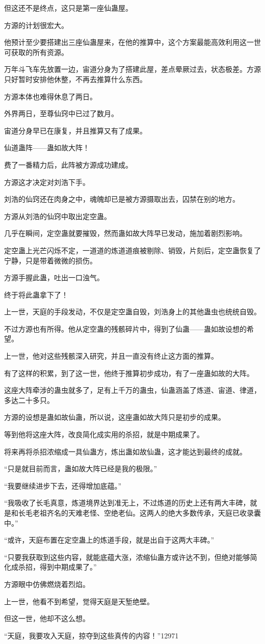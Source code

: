 \begin{this_body}
但这还不是终点，这只是第一座仙蛊屋。

方源的计划很宏大。

他预计至少要搭建出三座仙蛊屋来，在他的推算中，这个方案最能高效利用这一世可获取的所有资源。

万年斗飞车先放置一边，宙道分身为了搭建此屋，差点晕厥过去，状态极差。方源只好暂时安排他休整，不再去推算什么东西。

方源本体也难得休息了两日。

外界两日，至尊仙窍中已过了数月。

宙道分身早已在康复，并且推算又有了成果。

仙道蛊阵——蛊如故大阵！

费了一番精力后，此阵被方源成功建成。

方源这才决定对刘浩下手。

刘浩的仙窍还在肉身之中，魂魄却已是被方源摄取出去，囚禁在别的地方。

方源从刘浩的仙窍中取出定空蛊。

几乎在瞬间，定空蛊就要摧毁，然而蛊如故大阵早已发动，施加着剧烈影响。

定空蛊上光芒闪烁不定，一道道的炼道道痕被剔除、销毁，片刻后，定空蛊恢复了宁静，只是带着微微的损伤。

方源手握此蛊，吐出一口浊气。

终于将此蛊拿下了！

上一世，天庭的手段发动，不仅是定空蛊自毁，刘浩身上的其他蛊虫也统统自毁。

不过方源也有所得。他从定空蛊的残骸碎片中，得到了仙蛊——蛊如故设想的希望。

上一世，他对这些残骸深入研究，并且一直没有终止这方面的推算。

有了这样的积累，到了这一世，他终于推算初步成功，有了一座蛊如故的大阵。

这座大阵牵涉的蛊虫就多了，足有上千万的蛊虫，仙蛊涵盖了炼道、宙道、律道，多达二十多只。

方源的设想是蛊如故仙蛊，所以说，这座蛊如故大阵只是初步的成果。

等到他将这座大阵，改良简化成实用的杀招，就是中期成果了。

将来再将杀招浓缩成一具仙蛊方，炼出蛊如故仙蛊，这才能达到最终的成就。

“只是就目前而言，蛊如故大阵已经是我的极限。”

“我要继续进步下去，还得增加底蕴。”

“我吸收了长毛真意，炼道境界达到准无上，不过炼道的历史上还有两大丰碑，就是和长毛老祖齐名的天难老怪、空绝老仙。这两人的绝大多数传承，天庭已收录囊中。”

“或许，天庭布置在定空蛊上的炼道手段，就是出自于这两大丰碑。”

“只要我获取到这些内容，就能底蕴大涨，浓缩仙蛊方或许达不到，但绝对能够简化成杀招，得到中期成果了。”

方源眼中仿佛燃烧着烈焰。

上一世，他看不到希望，觉得天庭是天堑绝壁。

但这一世，他却不这么想。

“天庭，我要攻入天庭，掠夺到这些真传的内容！”12971

\end{this_body}

